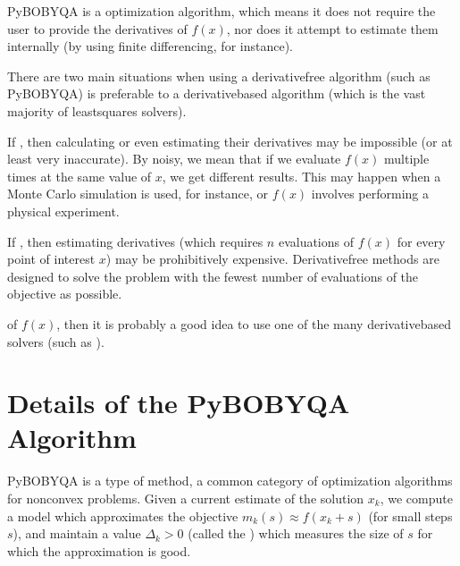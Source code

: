 \documentclass[letterpaper,10pt,english]{sphinxmanual}
\begin{document}
Py\sphinxhyphen{}BOBYQA is a  optimization algorithm, which means it does not require the user to provide the derivatives of \(f(x)\), nor does it attempt to estimate them internally (by using finite differencing, for instance).

There are two main situations when using a derivative\sphinxhyphen{}free algorithm (such as Py\sphinxhyphen{}BOBYQA) is preferable to a derivative\sphinxhyphen{}based algorithm (which is the vast majority of least\sphinxhyphen{}squares solvers).

If , then calculating or even estimating their derivatives may be impossible (or at least very inaccurate). By noisy, we mean that if we evaluate \(f(x)\) multiple times at the same value of \(x\), we get different results. This may happen when a Monte Carlo simulation is used, for instance, or \(f(x)\) involves performing a physical experiment.

If , then estimating derivatives (which requires \(n\) evaluations of \(f(x)\) for every point of interest \(x\)) may be prohibitively expensive. Derivative\sphinxhyphen{}free methods are designed to solve the problem with the fewest number of evaluations of the objective as possible.

 of \(f(x)\), then it is probably a good idea to use one of the many derivative\sphinxhyphen{}based solvers (such as ).


\section{Details of the Py\sphinxhyphen{}BOBYQA Algorithm}
\label{\detokenize{info:details-of-the-py-bobyqa-algorithm}}
Py\sphinxhyphen{}BOBYQA is a type of  method, a common category of optimization algorithms for nonconvex problems. Given a current estimate of the solution \(x_k\), we compute a model which approximates the objective \(m_k(s)\approx f(x_k+s)\) (for small steps \(s\)), and maintain a value \(\Delta_k>0\) (called the ) which measures the size of \(s\) for which the approximation is good.
\end{document}
